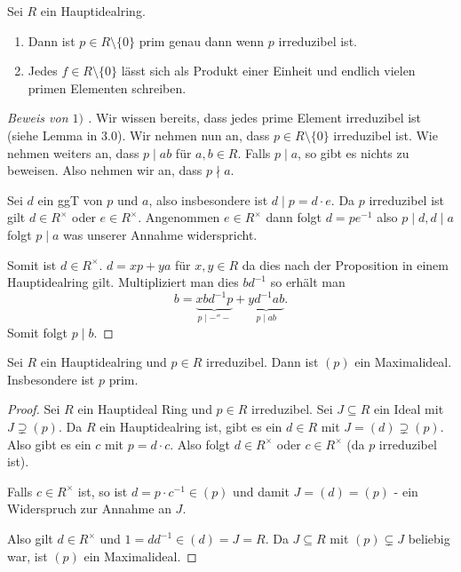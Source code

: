 \begin{theorem}
	Sei $R$ ein Hauptidealring.
	\begin{enumerate}[1)]
		\item Dann ist $p \in R \setminus \{0\} $ prim genau dann wenn $p$ irreduzibel ist.
		\item Jedes $f \in R \setminus \{0\} $ lässt sich als Produkt einer Einheit und endlich vielen primen Elementen schreiben.
	\end{enumerate}
\end{theorem}

\begin{proof}[Beweis von $1)$ ]
	Wir wissen bereits, dass jedes prime Element irreduzibel ist (siehe Lemma in $3.0$).
	Wir nehmen nun an, dass $p \in R \setminus \{0\} $ irreduzibel ist.
	Wie nehmen weiters an, dass $p \mid ab$ für $a,b \in R$.
	Falls $p \mid a$, so gibt es nichts zu beweisen.
	Also nehmen wir an, dass $p \nmid a$.

	Sei $d$ ein ggT von $p$ und $a$, also insbesondere ist $d \mid p = d \cdot e$.
	Da $p$ irreduzibel ist gilt $d \in R^{\times}$ oder $e \in R^{\times}$.
	Angenommen $e \in R^{\times}$ dann folgt $d = p e^{-1}$ also $p \mid d, d \mid a$ folgt $p \mid a$ was unserer Annahme widerspricht.

	Somit ist $d \in R^{\times}$. $d = x p + y a$ für $x,y \in R$ da dies nach der Proposition in einem Hauptidealring gilt.
	Multipliziert man dies $b d^{-1}$ so erhält man
	\[
		b = \underbrace{x b d ^{-1} p}_{p \mid -''-} + \underbrace{y d ^{-1} a b}_{p \mid ab}
	.\] 
	Somit folgt $p \mid b$.
\end{proof}

\begin{theorem}
	Sei $R$ ein Hauptidealring und $p \in R$ irreduzibel.
	Dann ist $(p)$ ein Maximalideal. Insbesondere ist $p$ prim.
\end{theorem}

\begin{proof}
	Sei $R$ ein Hauptideal Ring und $p \in R$ irreduzibel.
	Sei $J \subseteq R$ ein Ideal mit $J \supsetneq (p)$.
	Da  $R$ ein Hauptidealring ist, gibt es ein $d \in R$ mit $J = (d) \supsetneq (p)$.
	Also gibt es ein $c$ mit $p = d \cdot c$.
	Also folgt $d \in R^{\times}$ oder $c \in R^{\times}$ (da $p$ irreduzibel ist).

	Falls $c \in R^{\times}$ ist, so ist $d = p \cdot c^{-1} \in (p)$ und damit $J = (d) = (p)$ - ein Widerspruch zur Annahme an  $J$.

	Also gilt $d \in R^{\times}$ und $1 = d d^{-1} \in (d) = J = R$.
	Da $J \subseteq R$ mit $(p) \subsetneq J$ beliebig war, ist $ (p)$ ein Maximalideal.
\end{proof}

